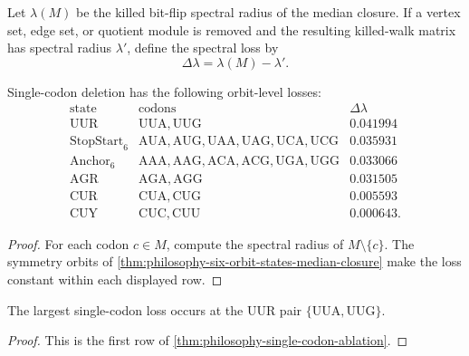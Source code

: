 \begin{definition}
\label{def:philosophy-spectral-ablation}
Let $\lambda(M)$ be the killed bit-flip spectral radius of the median
closure. If a vertex set, edge set, or quotient module is removed and
the resulting killed-walk matrix has spectral radius $\lambda'$, define
the spectral loss by
$$
  \Delta\lambda=\lambda(M)-\lambda'.
$$
\end{definition}

\begin{theorem}
\label{thm:philosophy-single-codon-ablation}
Single-codon deletion has the following orbit-level losses:
$$
\begin{array}{c|l|r}
  \text{state} & \text{codons} & \Delta\lambda\\
  \hline
  \mathrm{UUR} & \mathrm{UUA},\mathrm{UUG} & 0.041994\\
  \mathrm{StopStart}_{6}
    & \mathrm{AUA},\mathrm{AUG},\mathrm{UAA},\mathrm{UAG},
      \mathrm{UCA},\mathrm{UCG} & 0.035931\\
  \mathrm{Anchor}_{6}
    & \mathrm{AAA},\mathrm{AAG},\mathrm{ACA},\mathrm{ACG},
      \mathrm{UGA},\mathrm{UGG} & 0.033066\\
  \mathrm{AGR} & \mathrm{AGA},\mathrm{AGG} & 0.031505\\
  \mathrm{CUR} & \mathrm{CUA},\mathrm{CUG} & 0.005593\\
  \mathrm{CUY} & \mathrm{CUC},\mathrm{CUU} & 0.000643.
\end{array}
$$
\end{theorem}
\begin{proof}
For each codon $c\in M$, compute the spectral radius of
$M\setminus\{c\}$. The symmetry orbits of
\autoref{thm:philosophy-six-orbit-states-median-closure} make the loss
constant within each displayed row.
\end{proof}

\begin{corollary}
\label{cor:philosophy-uur-point-spectral-hinge}
The largest single-codon loss occurs at the $\mathrm{UUR}$ pair
$\{\mathrm{UUA},\mathrm{UUG}\}$.
\end{corollary}
\begin{proof}
This is the first row of
\autoref{thm:philosophy-single-codon-ablation}.
\end{proof}

